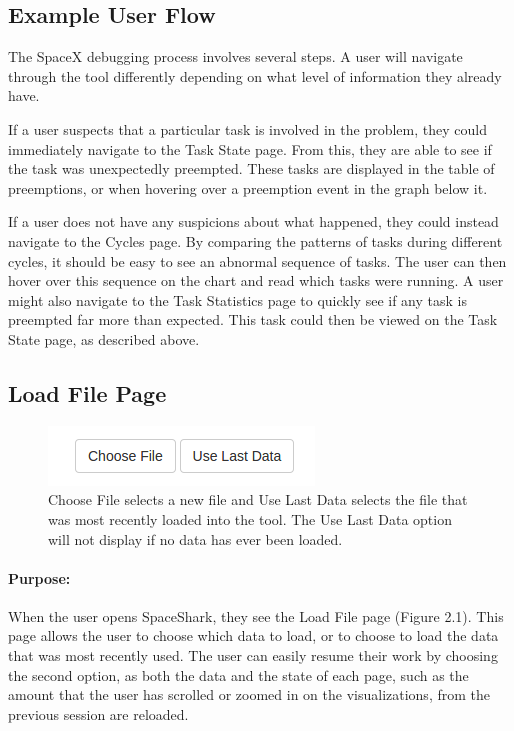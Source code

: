 \documentclass{hmcclinic}
\begin{document}
\subsection{Example User Flow}
  The SpaceX debugging process involves several steps.  A user will navigate
  through the tool differently depending on what level of information they
  already have.

  If a user suspects that a particular task is involved in the problem, they
  could immediately navigate to the Task State page. From this, they are able to
  see if the task was unexpectedly preempted. These tasks are displayed in the
  table of preemptions, or when hovering over a preemption event in the graph
  below it.

  If a user does not have any suspicions about what happened, they could instead
  navigate to the Cycles page. By comparing the patterns of tasks during
  different cycles, it should be easy to see an abnormal sequence of tasks. The
  user can then hover over this sequence on the chart and read which tasks were
  running. A user might also navigate to the Task Statistics page to quickly see
  if any task is preempted far more than expected. This task could then be
  viewed on the Task State page, as described above.

%

\subsection{Load File Page}

\begin{figure}[H]
  \centering
      \includegraphics[scale=0.75]{loadFile-buttons.png}
  \caption{Choose File selects a new file and Use Last Data selects the file
  that was most recently loaded into the tool. The Use Last Data option will not
display if no data has ever been loaded.}
  \end{figure}

\paragraph{Purpose:}
When the user opens SpaceShark, they see the Load File page (Figure 2.1).  This
page allows the user to choose which data to load, or to choose to load the data
that was most recently used.  The user can easily resume their work by choosing
the second option, as both the data and the state of each page, such as the amount that the user has scrolled or zoomed in on the visualizations, from the
previous session are reloaded.
\end{document}
